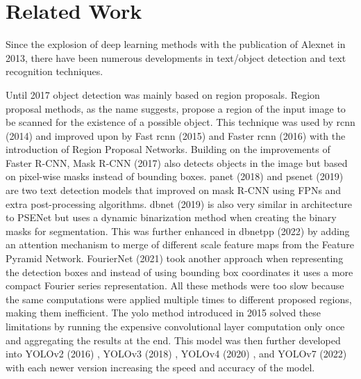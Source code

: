 \chapter{Related Work}
\label{ch:rw}

Since the explosion of deep learning methods with the publication of Alexnet in 2013, there have been numerous developments in text/object detection and text recognition techniques.

Until 2017 object detection was mainly based on region proposals. Region proposal methods, as the name suggests, propose a region of the input image to be scanned for the existence of a possible object. This technique was used by \gls{rcnn} \cite{girshick_rich_2014} (2014) and improved upon by Fast \gls{rcnn} \cite{girshick_fast_2015} (2015) and Faster \gls{rcnn} \cite{ren_faster_2017} (2016) with the introduction of Region Proposal Networks. Building on the improvements of Faster R-CNN, Mask R-CNN \cite{he_mask_2017} (2017) also detects objects in the image but based on pixel-wise masks instead of bounding boxes. \gls{panet} \cite{liu_path_2018} (2018) and \gls{psenet} \cite{wang_shape_2019} (2019) are two text detection models that improved on mask R-CNN using FPNs and extra post-processing algorithms. \gls{dbnet} \cite{liao_real-time_2019} (2019) is also very similar in architecture to PSENet but uses a dynamic binarization method when creating the binary masks for segmentation. This was further enhanced in \gls{dbnetpp} \cite{liao_real-time_2023} (2022) by adding an attention mechanism to merge of different scale feature maps from the Feature Pyramid Network. FourierNet \cite{riaz_fouriernet_2021} (2021) took another approach when representing the detection boxes and instead of using bounding box coordinates it uses a more compact Fourier series representation. All these methods were too slow because the same computations were applied multiple times to different proposed regions, making them inefficient. The \gls{yolo} method introduced in 2015 \cite{redmon_you_2016} solved these limitations by running the expensive convolutional layer computation only once and aggregating the results at the end. This model was then further developed into YOLOv2 (2016) \cite{redmon_yolo9000_2017}, YOLOv3 (2018) \cite{redmon_yolov3_2018}, YOLOv4 (2020) \cite{wang_scaled-yolov4_2021}, and YOLOv7 (2022) \cite{wang_yolov7_2022} with each newer version increasing the speed and accuracy of the model.

